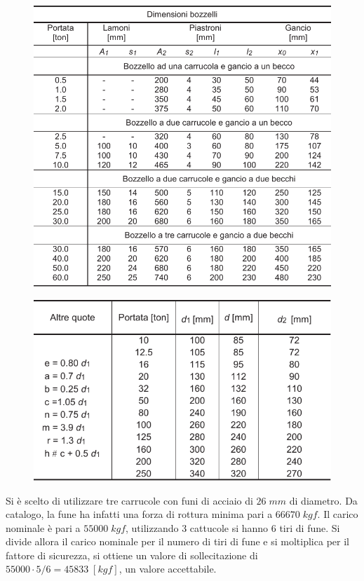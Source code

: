 \begin{figure}[H]
\centering
\begin{minipage}{.5\textwidth}
  \centering
  \includegraphics[width=.7\linewidth]{imgs/DimGen.pdf}
  \label{fig:DimGen}
\end{minipage}%
\begin{minipage}{.5\textwidth}
  \centering
  \includegraphics[width=.9\linewidth]{imgs/DimGen2.pdf}
  \label{fig:DimGen2}
\end{minipage}
\end{figure}
Si è scelto di utilizzare tre carrucole con funi di acciaio di $26 \; mm$ di diametro. Da catalogo, la fune ha infatti una forza di rottura minima pari a $66670 \; kgf$. Il carico nominale è pari a $55000\;kgf$, utilizzando 3 cattucole si hanno 6 tiri di fune. Si divide allora il carico nominale per il numero di tiri di fune e si moltiplica per il fattore di sicurezza, si ottiene un valore di sollecitazione di $55000 \cdot 5/6 = 45833\; [kgf]$, un valore accettabile. 

